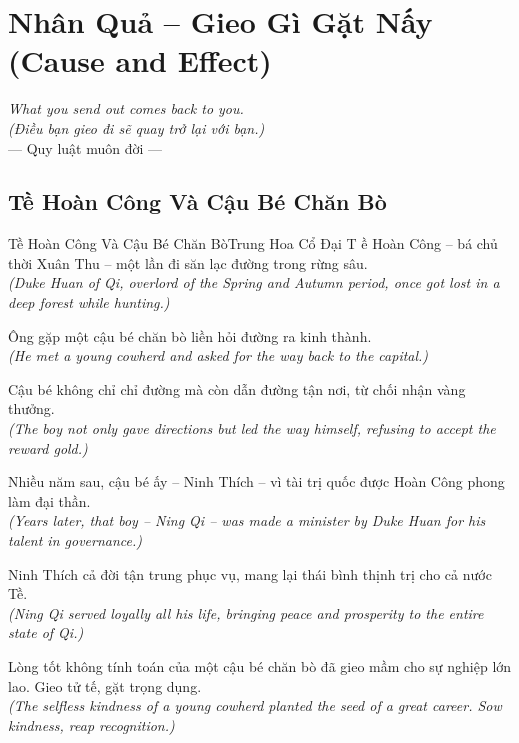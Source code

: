 \chapter{Nhân Quả -- Gieo Gì Gặt Nấy (Cause and Effect)}
\begin{center}
  \textit{\color{truyenblue}What you send out comes back to you.}\\
  \textit{(Điều bạn gieo đi sẽ quay trở lại với bạn.)}\\[4pt]
  \small\color{truyengold}--- Quy luật muôn đời ---
\end{center}
\ngancach

\section{Tề Hoàn Công Và Cậu Bé Chăn Bò}
\begin{truyen}{Tề Hoàn Công Và Cậu Bé Chăn Bò}{Trung Hoa Cổ Đại}
T ề Hoàn Công -- bá chủ thời Xuân Thu -- một lần đi săn lạc đường trong rừng sâu.\\
\textit{(Duke Huan of Qi, overlord of the Spring and Autumn period, once got lost in a deep forest while hunting.)}

Ông gặp một cậu bé chăn bò liền hỏi đường ra kinh thành.\\
\textit{(He met a young cowherd and asked for the way back to the capital.)}

Cậu bé không chỉ chỉ đường mà còn dẫn đường tận nơi, từ chối nhận vàng thưởng.\\
\textit{(The boy not only gave directions but led the way himself, refusing to accept the reward gold.)}

Nhiều năm sau, cậu bé ấy -- Ninh Thích -- vì tài trị quốc được Hoàn Công phong làm đại thần.\\
\textit{(Years later, that boy -- Ning Qi -- was made a minister by Duke Huan for his talent in governance.)}

Ninh Thích cả đời tận trung phục vụ, mang lại thái bình thịnh trị cho cả nước Tề.\\
\textit{(Ning Qi served loyally all his life, bringing peace and prosperity to the entire state of Qi.)}

\end{truyen}
\begin{baihoc}
  Lòng tốt không tính toán của một cậu bé chăn bò đã gieo mầm cho sự nghiệp lớn lao. Gieo tử tế, gặt trọng dụng.\\
  \textit{(The selfless kindness of a young cowherd planted the seed of a great career. Sow kindness, reap recognition.)}
\end{baihoc}

